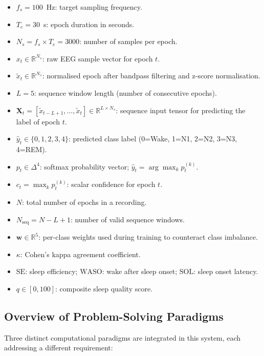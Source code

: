 \documentclass[10pt]{article}
\begin{document}
\begin{itemize}
  \item $f_s = 100$~Hz: target sampling frequency.
  \item $T_e = 30$~s: epoch duration in seconds.
  \item $N_s = f_s \times T_e = 3000$: number of samples per epoch.
  \item $x_t \in \mathbb{R}^{N_s}$: raw EEG sample vector for epoch $t$.
  \item $\tilde{x}_t \in \mathbb{R}^{N_s}$: normalised epoch after bandpass filtering and z-score normalisation.
  \item $L = 5$: sequence window length (number of consecutive epochs).
  \item $\mathbf{X}_t = [\tilde{x}_{t-L+1}, \ldots, \tilde{x}_t] \in \mathbb{R}^{L \times N_s}$: sequence input tensor for predicting the label of epoch $t$.
  \item $\hat{y}_t \in \{0,1,2,3,4\}$: predicted class label (0=Wake, 1=N1, 2=N2, 3=N3, 4=REM).
  \item $p_t \in \Delta^4$: softmax probability vector; $\hat{y}_t = \arg\max_k p_t^{(k)}$.
  \item $c_t = \max_k p_t^{(k)}$: scalar confidence for epoch $t$.
  \item $N$: total number of epochs in a recording.
  \item $N_{\text{seq}} = N - L + 1$: number of valid sequence windows.
  \item $\mathbf{w} \in \mathbb{R}^5$: per-class weights used during training to counteract class imbalance.
  \item $\kappa$: Cohen's kappa agreement coefficient.
  \item $\text{SE}$: sleep efficiency; $\text{WASO}$: wake after sleep onset; $\text{SOL}$: sleep onset latency.
  \item $q \in [0, 100]$: composite sleep quality score.
\end{itemize}

\subsection{Overview of Problem-Solving Paradigms}
\label{sec:paradigms}

Three distinct computational paradigms are integrated in this system, each addressing a different requirement:
\end{document}
